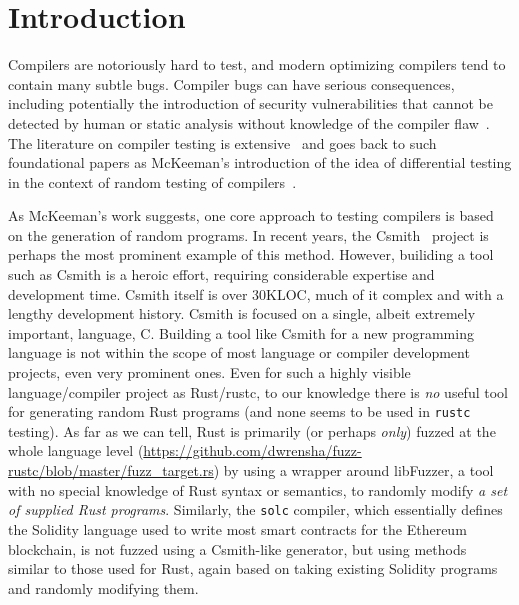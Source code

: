 \section{Introduction}

Compilers are notoriously hard to test, and modern optimizing
compilers tend to contain many subtle bugs.  Compiler bugs can have
serious consequences, including potentially the introduction of
security vulnerabilities that cannot be detected by human or static
analysis without knowledge of the compiler flaw~\cite{CompBug}.   The
literature on compiler testing is extensive~\cite{chen2020survey} and
goes back to such foundational papers as McKeeman's introduction of
the idea of differential testing in the context of random testing of
compilers~\cite{Differential}.

As McKeeman's work suggests, one core approach to testing compilers is
based on
the generation of random programs.  In recent
years, the Csmith~\cite{csmith} project is perhaps the most prominent
example of this method.  However, builiding a tool such as Csmith
is a heroic effort, requiring considerable expertise and
development time.  Csmith itself is over 30KLOC, much of it complex
and with a lengthy development history.  Csmith is focused on a
single, albeit extremely important, language, C.  Building a tool like
Csmith for a new programming language is not within the scope of most
language or compiler development projects, even very prominent ones.  Even for such a highly
visible language/compiler project as Rust/rustc, to our knowledge
there is \emph{no} useful tool for generating random Rust programs
(and none seems to be
used in {\tt rustc} testing).  As far as we can tell, Rust
is primarily (or perhaps \emph{only}) fuzzed at the whole language
level
(\url{https://github.com/dwrensha/fuzz-rustc/blob/master/fuzz_target.rs}) by
using a wrapper around libFuzzer, a tool with no special knowledge of Rust
syntax or semantics, to randomly modify \emph{a set of supplied Rust
programs}.  Similarly, the {\tt solc} compiler, which essentially
defines the Solidity language used to write most smart contracts for
the Ethereum blockchain, is not fuzzed using a Csmith-like
generator, but using methods similar to those used for
Rust, again based on taking
existing Solidity programs and randomly modifying them.

